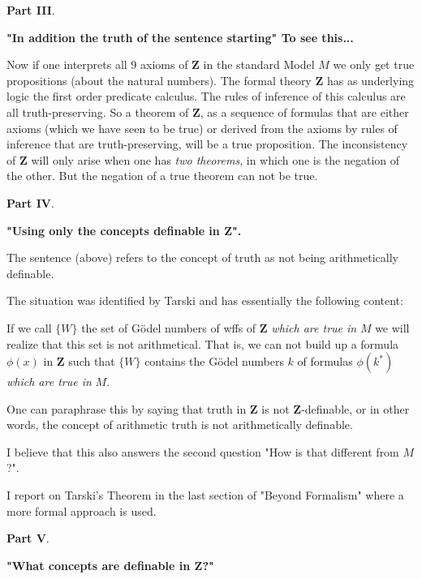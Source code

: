 \documentclass[12pt]{article}
\begin{document}
\begin{large}
\textbf{Part III}.
\end{large}

\textbf{"In addition the truth of the sentence starting" To see this...}

Now if one interprets all 9 axioms of $\textbf{Z}$ in the standard Model $M$ we only get true propositions (about the natural numbers). The formal theory $\textbf{Z}$ has as underlying logic the first order predicate calculus. The rules of inference of this calculus are all truth-preserving. So a theorem of $\textbf{Z}$, as a sequence of formulas that are either axioms (which we have seen to be true) or derived from the axioms by rules of inference that are truth-preserving, will be a true proposition. The inconsistency of $\textbf{Z}$ will only arise when one has \emph{two theorems}, in which one is the negation of the other. But the negation of a true theorem can not be true.

\begin{large}
\textbf{Part IV}.
\end{large}

\textbf{"Using only the concepts definable in $\textbf{Z}$".}

The sentence (above) refers to the concept of truth as not being arithmetically definable.

The situation was identified by Tarski and has essentially the following content:

If we call $\{ W \}$ the set of G\"odel numbers of wffs of $\textbf{Z}$ \emph{which are true in} $M$ we will realize that this set is not arithmetical. That is, we can not build up a formula $\phi (x)$ in $\textbf{Z}$ such that $\{ W \}$ contains the G\"odel numbers $k$ of formulas $\phi (k^*)$ \emph{which are true in} $M$.

One can paraphrase this by saying that truth in $\textbf{Z}$ is not $\textbf{Z}$-definable, or in other words, the concept of arithmetic truth is not arithmetically definable.

I believe that this also answers the second question "How is that different from $M$?".

I report on Tarski's Theorem in the last section of "Beyond Formalism" where a more formal approach is used.

\begin{large}
\textbf{Part V}.
\end{large}

\textbf{"What concepts are definable in $\textbf{Z}$?"}
\end{document}
